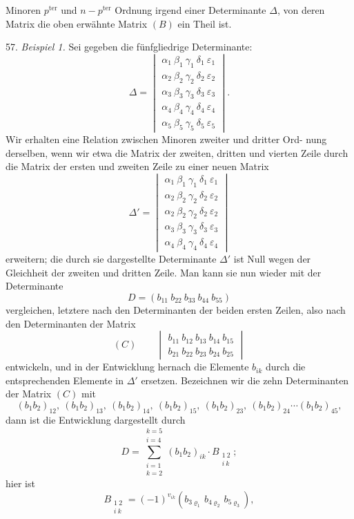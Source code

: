 \documentclass[11pt]{article}
\providecommand{\weberpage}[1]{}
\let\Delta\varDelta
\begin{document}
\weberpage{63}
Minoren $p^{\text{ter}}$ und $n-p^{\text{ter}}$ Ordnung irgend einer Determinante $\Delta$, von
deren Matrix die oben erwähnte Matrix $(B)$ ein Theil ist.

57. \textit{Beispiel 1.} Sei gegeben die fünfgliedrige Determinante:
\[
\Delta = \begin{vmatrix}
\alpha_1\ \beta_1\ \gamma_1\ \delta_1\ \varepsilon_1 \\
\alpha_2\ \beta_2\ \gamma_2\ \delta_2\ \varepsilon_2 \\
\alpha_3\ \beta_3\ \gamma_3\ \delta_3\ \varepsilon_3 \\
\alpha_4\ \beta_4\ \gamma_4\ \delta_4\ \varepsilon_4 \\
\alpha_5\ \beta_5\ \gamma_5\ \delta_5\ \varepsilon_5
\end{vmatrix} .
\]
Wir erhalten eine Relation zwischen Minoren zweiter und dritter Ord-
nung derselben, wenn wir etwa die Matrix der zweiten, dritten und
vierten Zeile durch die Matrix der ersten und zweiten Zeile zu einer
neuen Matrix
\[
\Delta' = \begin{vmatrix}
\alpha_1\ \beta_1\ \gamma_1\ \delta_1\ \varepsilon_1 \\
\alpha_2\ \beta_2\ \gamma_2\ \delta_2\ \varepsilon_2 \\
\alpha_2\ \beta_2\ \gamma_2\ \delta_2\ \varepsilon_2 \\
\alpha_3\ \beta_3\ \gamma_3\ \delta_3\ \varepsilon_3 \\
\alpha_4\ \beta_4\ \gamma_4\ \delta_4\ \varepsilon_4
\end{vmatrix}
\]
erweitern; die durch sie dargestellte Determinante $\Delta'$ ist Null wegen
der Gleichheit der zweiten und dritten Zeile. Man kann sie nun wieder
mit der Determinante
\[
D = \left(b_{11}\ b_{22}\ b_{33}\ b_{44}\ b_{55}\right)
\]
vergleichen, letztere nach den Determinanten der beiden ersten Zeilen,
also nach den Determinanten der Matrix
\[
(C) \qquad \begin{vmatrix} b_{11}\ b_{12}\ b_{13}\ b_{14}\ b_{15} \\ b_{21}\ b_{22}\ b_{23}\ b_{24}\ b_{25} \end{vmatrix}
\]
entwickeln, und in der Entwicklung hernach die Elemente $b_{ik}$ durch
die entsprechenden Elemente in $\Delta'$ ersetzen. Bezeichnen wir die zehn
Determinanten der Matrix $(C)$ mit
\[
(b_1b_2)_{12},\ (b_1b_2)_{13},\ (b_1b_2)_{14},\ (b_1b_2)_{15},\ (b_1b_2)_{23},\ (b_1b_2)_{24}\cdots (b_1b_2)_{45},
\]
dann ist die Entwicklung dargestellt durch
\[
D = \sum_{\substack{i=1\\ k=2}}^{\substack{k=5\\ i=4}} (b_1b_2)_{ik}\cdot B_{\substack{1\ 2\\ i\ k}};
\]
hier ist
\[
B_{\substack{1\ 2\\ i\ k}} = (-1)^{v_{ik}}\left(b_{3\varrho_1}\, b_{4\varrho_2}\, b_{5\varrho_3}\right),
\]
\end{document}
